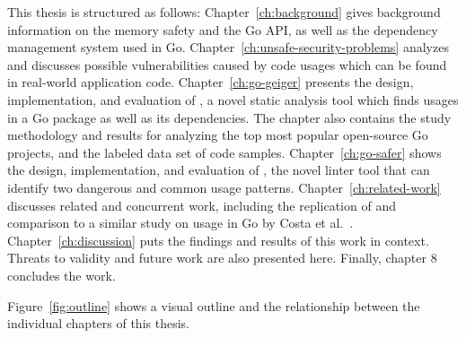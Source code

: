 This thesis is structured as follows: Chapter~\ref{ch:background} gives background information on the memory safety
and the Go \unsafe{} API, as well as the dependency management system used in Go.
Chapter~\ref{ch:unsafe-security-problems} analyzes and discusses possible vulnerabilities caused by \unsafe{} code
usages which can be found in real-world application code.
Chapter~\ref{ch:go-geiger} presents the design, implementation, and evaluation of \toolGeiger, a novel static analysis
tool which finds \unsafe{} usages in a Go package as well as its dependencies.
The chapter also contains the study methodology and results for analyzing the top \projsTotal{} most popular open-source
Go projects, and the labeled data set of \numberLabeledCodeSnippets{} code samples.
Chapter~\ref{ch:go-safer} shows the design, implementation, and evaluation of \toolSafer, the novel linter tool that
can identify two dangerous and common \unsafe{} usage patterns.
Chapter~\ref{ch:related-work} discusses related and concurrent work, including the replication of and comparison to a
similar study on \unsafe{} usage in Go by Costa et al.~\cite{costa2020}.
Chapter~\ref{ch:discussion} puts the findings and results of this work in context.
Threats to validity and future work are also presented here.
Finally, chapter 8 concludes the work.

Figure~\ref{fig:outline} shows a visual outline and the relationship between the individual chapters of this thesis.


